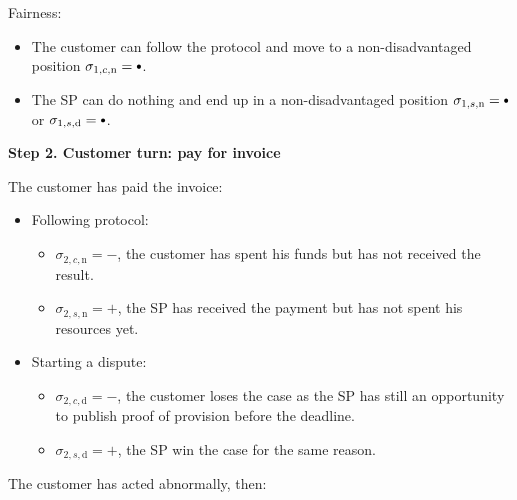 \documentclass{ieeeaccess}
\newcommand\sbullet[1][.75]{\mathbin{\ThisStyle{\vcenter{\hbox{%
  \scalebox{#1}{$\SavedStyle\bullet$}}}}}%
}
\begin{document}
Fairness:

\begin{itemize}

\item
  The customer can follow the protocol and move to a non-disadvantaged
  position \(\sigma_{1, c, \mathrm{n}} = \sbullet\).
\item
  The SP can do nothing and end up in a non-disadvantaged position
  \(\sigma_{1, s, \mathrm{n}} = \sbullet \) or
  \(\sigma_{1, s, \mathrm{d}} = \sbullet \).
\end{itemize}

\noindent \textbf
{Step 2. Customer turn: pay for invoice}\label{step-2-pay-for-invoice}

The customer has paid the invoice:

\begin{itemize}
\item
  Following protocol:
  \begin{itemize}
  \item
    \(\sigma_{2, c, \mathrm{n}} = -\), the customer has spent his funds but has not received the result.
  \item
    \(\sigma_{2, s, \mathrm{n}} = +\), the SP has received the payment but has not spent his resources yet.
  \end{itemize}
\item
  Starting a dispute:

  \begin{itemize}
  \item
    \(\sigma_{2, c, \mathrm{d}} = -\), the customer loses the case as the SP has still an opportunity to publish proof of provision before the deadline.
  \item
    \(\sigma_{2, s, \mathrm{d}} = +\), the SP win the case for the same reason.
  \end{itemize}
\end{itemize}

The customer has acted abnormally, then:
\end{document}
